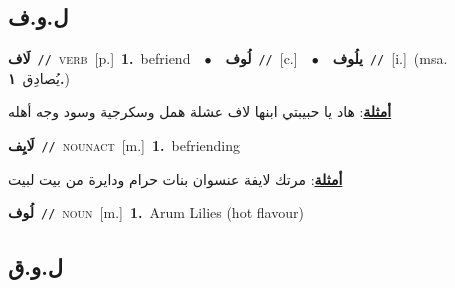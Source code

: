\documentclass[10pt,a4paper,twoside]{article} %
\begin{document}
\begin{multicols}{2}
\vspace{-3mm}
\subsection*{\color{blue}\foreignlanguage{arabic}{ل.و.ف}\color{blue}{}} 

{\setlength\topsep{0pt}\textbf{\foreignlanguage{arabic}{لَاف}}\ {\color{gray}\texttt{//}\color{black}}\ \textsc{verb}\ [p.]\ \textbf{1.}~befriend\ \ $\bullet$\ \ \setlength\topsep{0pt}\textbf{\foreignlanguage{arabic}{لُوف}}\ {\color{gray}\texttt{//}\color{black}}\ [c.]\ \ $\bullet$\ \ \setlength\topsep{0pt}\textbf{\foreignlanguage{arabic}{يلُوف}}\ {\color{gray}\texttt{//}\color{black}}\ [i.]\ \color{gray}(msa. \foreignlanguage{arabic}{يُصادِق}~\foreignlanguage{arabic}{\textbf{١.}})\color{black}\  \begin{flushright}\color{gray}\foreignlanguage{arabic}{\textbf{\underline{\foreignlanguage{arabic}{أمثلة}}}: هاد يا حبيبتي ابنها لاف عشلة همل وسكرجية وسود وجه أهله}\end{flushright}\color{black}} \vspace{2mm}

{\setlength\topsep{0pt}\textbf{\foreignlanguage{arabic}{لَايِف}}\ {\color{gray}\texttt{//}\color{black}}\ \textsc{noun\textunderscore act}\ [m.]\ \textbf{1.}~befriending\  \begin{flushright}\color{gray}\foreignlanguage{arabic}{\textbf{\underline{\foreignlanguage{arabic}{أمثلة}}}: مرتك لايفة عنسوان بنات حرام ودايرة من بيت لبيت}\end{flushright}\color{black}} \vspace{2mm}

{\setlength\topsep{0pt}\textbf{\foreignlanguage{arabic}{لُوف}}\ {\color{gray}\texttt{//}\color{black}}\ \textsc{noun}\ [m.]\ \textbf{1.}~Arum Lilies (hot flavour)\ } \vspace{2mm}

\vspace{-3mm}
\subsection*{\color{blue}\foreignlanguage{arabic}{ل.و.ق}\color{blue}{}} 


\end{multicols}
\end{document}
